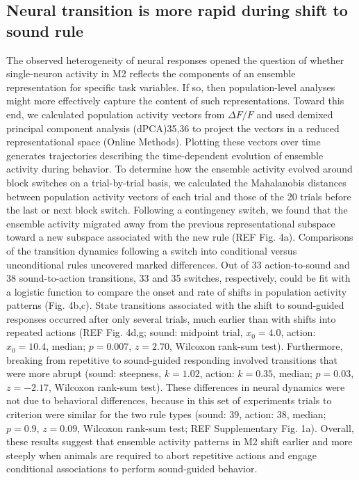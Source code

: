 \subsection{Neural transition is more rapid during shift to sound rule}
The observed heterogeneity of neural responses opened the question of whether single-neuron activity in M2 reflects the components of an ensemble representation for specific task variables. If so, then population-level analyses might more effectively capture the content of such representations. Toward this end, we calculated population activity vectors from $\Delta F/F$ and used demixed principal component analysis (dPCA)35,36 to project the vectors in a reduced representational space (Online Methods). Plotting these vectors over time generates trajectories describing the time-dependent evolution of ensemble activity during behavior. To determine how the ensemble activity evolved around block switches on a trial-by-trial basis, we calculated the Mahalanobis distances between population activity vectors of each trial and those of the 20 trials before the last or next block switch. Following a contingency switch, we found that the ensemble activity migrated away from the previous representational subspace toward a new subspace associated with the new rule (REF Fig. 4a). Comparisons of the transition dynamics following a switch into conditional versus unconditional rules uncovered marked differences. Out of 33 action-to-sound and 38 sound-to-action transitions, 33 and 35 switches, respectively, could be fit with a logistic function to compare the onset and rate of shifts in population activity patterns (Fig. 4b,c). State transitions associated with the shift to sound-guided responses occurred after only several trials, much earlier than with shifts into repeated actions (REF Fig. 4d,g; sound: midpoint trial, $x_0 = 4.0$, action: $x_0 = 10.4$, median; $p = 0.007$, $z = 2.70$, Wilcoxon rank-sum test). Furthermore, breaking from repetitive to sound-guided responding involved transitions that were more abrupt (sound: steepness, $k = 1.02$, action: $k = 0.35$, median; $p = 0.03$, $z = -2.17$, Wilcoxon rank-sum test). These differences in neural dynamics were not due to behavioral differences, because in this set of experiments trials to criterion were similar for the two rule types (sound: 39, action: 38, median; $p = 0.9$, $z = 0.09$, Wilcoxon rank-sum test; REF Supplementary Fig. 1a). Overall, these results suggest that ensemble activity patterns in M2 shift earlier and more steeply when animals are required to abort repetitive actions and engage conditional associations to perform sound-guided behavior.


